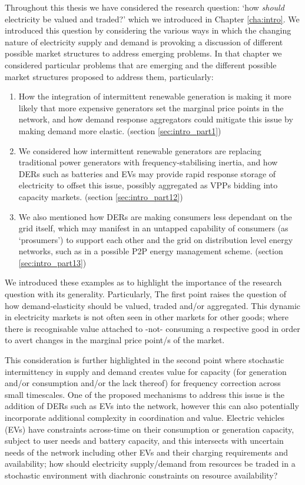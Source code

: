 Throughout this thesis we have considered the research question: `how \textit{should} electricity be valued and traded?' which we introduced in Chapter \ref{cha:intro}.
We introduced this question by considering the various ways in which the changing nature of electricity supply and demand is provoking a discussion of different possible market structures to address emerging problems.
In that chapter we considered particular problems that are emerging and the different possible market structures proposed to address them, particularly:
\begin{enumerate}
\item	How the integration of intermittent renewable generation is making it more likely that more expensive generators set the marginal price points in the network, and how demand response aggregators could mitigate this issue by making demand more elastic. (section \ref{sec:intro_part1})
\item	We considered how intermittent renewable generators are replacing traditional power generators with frequency-stabilising inertia, and how DERs such as batteries and EVs may provide rapid response storage of electricity to offset this issue, possibly aggregated as VPPs bidding into capacity markets. (section \ref{sec:intro_part12})
\item	We also mentioned how DERs are making consumers less dependant on the grid itself, which may manifest in an untapped capability of consumers (as `prosumers') to support each other and the grid on distribution level energy networks, such as in a possible P2P energy management scheme. (section \ref{sec:intro_part13})
\end{enumerate}

We introduced these examples as to highlight the importance of the research question with its generality.
Particularly, The first point raises the question of how demand-elasticity should be valued, traded and/or aggregated. This dynamic in electricity markets is not often seen in other markets for other goods; where there is recognisable value attached to -not- consuming a respective good in order to avert changes in the marginal price point/s of the market.

This consideration is further highlighted in the second point where stochastic intermittency in supply and demand creates value for capacity (for generation and/or consumption and/or the lack thereof) for frequency correction across small timescales.
One of the proposed mechanisms to address this issue is the addition of DERs such as EVs into the network, however this can also potentially incorporate additional complexity in coordination and value.
Electric vehicles (EVs) have constraints across-time on their consumption or generation capacity, subject to user needs and battery capacity, and this intersects with uncertain needs of the network including other EVs and their charging requirements and availability; how should electricity supply/demand from resources be traded in a stochastic environment with diachronic constraints on resource availability?

